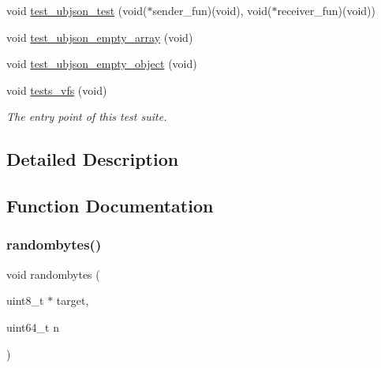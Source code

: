 \begin{DoxyCompactItemize}
\item 
void \hyperlink{group__unittests_gac5fe0b001cb96b33aaf4f1b52f7d38e9}{test\+\_\+ubjson\+\_\+test} (void($\ast$sender\+\_\+fun)(void), void($\ast$receiver\+\_\+fun)(void))
\item 
void \hyperlink{group__unittests_ga9da1a8e30a96a87edc4a759e4742b998}{test\+\_\+ubjson\+\_\+empty\+\_\+array} (void)
\item 
void \hyperlink{group__unittests_ga770a7e979bea402d2c2b99bded276d67}{test\+\_\+ubjson\+\_\+empty\+\_\+object} (void)
\item 
void \hyperlink{group__unittests_gad7fb89debf7b41f1a3a0d7d988f7654c}{tests\+\_\+vfs} (void)
\begin{DoxyCompactList}\small\item\em The entry point of this test suite. \end{DoxyCompactList}\end{DoxyCompactItemize}


\subsection{Detailed Description}

\begin{DoxyItemize}
\item 
\item 
\item 
\end{DoxyItemize}

\subsection{Function Documentation}
\mbox{\label{group__unittests_gad3aa6e3b3ad43afce8349ec384d40338}} 
\subsubsection{\texorpdfstring{randombytes()}{randombytes()}}
{\footnotesize\ttfamily void randombytes (\begin{DoxyParamCaption}\item[{uint8\+\_\+t $\ast$}]{target,  }\item[{uint64\+\_\+t}]{n }\end{DoxyParamCaption})}




